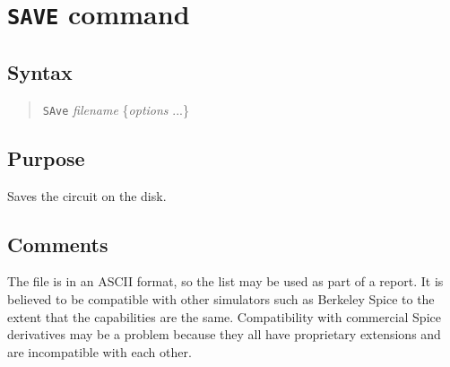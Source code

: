 %
%
%
%
\section{{\tt SAVE} command}
\subsection{Syntax}
\begin{verse}
{\tt SAve} {\it filename} \{{\it options} ...\}
\end{verse}
\subsection{Purpose}

Saves the circuit on the disk.
\subsection{Comments}

The file is in an ASCII format, so the list may be used as part of a
report.  It is believed to be compatible with other simulators such as 
Berkeley Spice to the extent that the capabilities are the same.  
Compatibility with commercial Spice derivatives may be a problem because
they all have proprietary extensions and are incompatible with each other.

